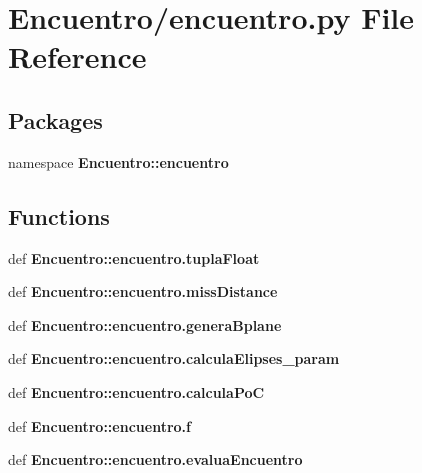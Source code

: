 \section{\-Encuentro/encuentro.py \-File \-Reference}
\label{encuentro_8py}
\subsection*{\-Packages}
\begin{DoxyCompactItemize}
\item 
namespace {\bf \-Encuentro\-::encuentro}
\end{DoxyCompactItemize}
\subsection*{\-Functions}
\begin{DoxyCompactItemize}
\item 
def {\bf \-Encuentro\-::encuentro.\-tupla\-Float}
\item 
def {\bf \-Encuentro\-::encuentro.\-miss\-Distance}
\item 
def {\bf \-Encuentro\-::encuentro.\-genera\-Bplane}
\item 
def {\bf \-Encuentro\-::encuentro.\-calcula\-Elipses\-\_\-param}
\item 
def {\bf \-Encuentro\-::encuentro.\-calcula\-Po\-C}
\item 
def {\bf \-Encuentro\-::encuentro.\-f}
\item 
def {\bf \-Encuentro\-::encuentro.\-evalua\-Encuentro}
\end{DoxyCompactItemize}
